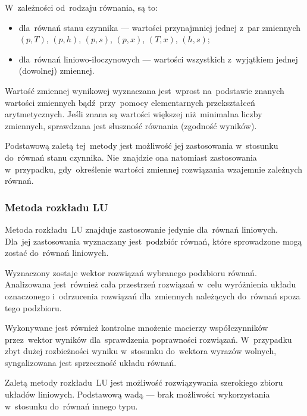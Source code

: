 W~zależności od~rodzaju równania, są to:

\begin{itemize}

	\item dla~równań stanu czynnika --- wartości przynajmniej jednej
		z~par zmiennych $(p, T)$, $(p, h)$, $(p, s)$, $(p, x)$,
		$(T, x)$, $(h, s)$;

	\item dla~równań liniowo-iloczynowych --- wartości wszystkich
		z~wyjątkiem jednej (dowolnej) zmiennej.

\end{itemize}

Wartość zmiennej wynikowej wyznaczana jest~wprost na~podstawie znanych
wartości zmiennych bądź~przy~pomocy elementarnych przekształceń
arytmetycznych. Jeśli znana są wartości większej niż~minimalna liczby
zmiennych, sprawdzana jest słuszność równania (zgodność wyników).

Podstawową zaletą tej~metody jest możliwość jej zastosowania w~stosunku
do~równań stanu czynnika. Nie~znajdzie ona natomiast zastosowania
w~przypadku, gdy~określenie wartości zmiennej rozwiązania wzajemnie
zależnych równań.


\subsubsection{Metoda rozkładu LU}

Metoda rozkładu~LU znajduje zastosowanie jedynie dla~równań liniowych.
Dla~jej zastosowania wyznaczany jest~podzbiór równań, które sprowadzone
mogą zostać do~równań liniowych.

Wyznaczony zostaje wektor rozwiązań wybranego podzbioru równań.
Analizowana jest~również cała przestrzeń rozwiązań w~celu wyróżnienia
układu oznaczonego i~odrzucenia rozwiązań dla~zmiennych należących
do~równań spoza tego podzbioru.

Wykonywane jest również kontrolne mnożenie macierzy współczynników
przez~wektor wyników dla~sprawdzenia poprawności rozwiązań. W~przypadku
zbyt dużej rozbieżności wyniku w~stosunku do~wektora wyrazów wolnych,
syngalizowana jest sprzeczność układu równań.

Zaletą metody rozkładu~LU jest możliwość rozwiązywania szerokiego zbioru
układów liniowych. Podstawową wadą --- brak możliwości wykorzystania
w~stosunku do~równań innego typu.
